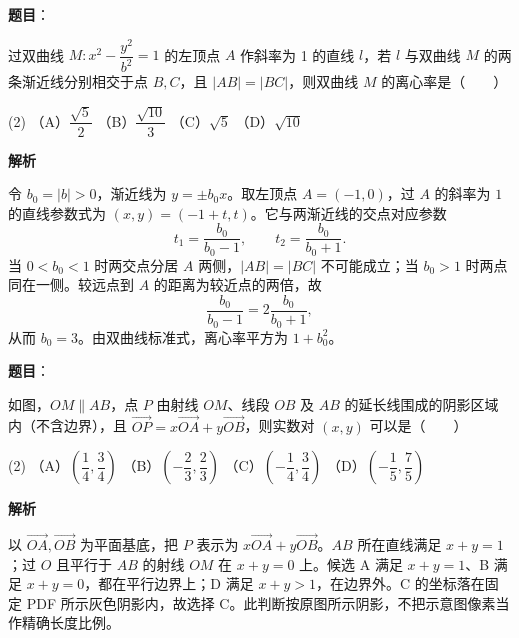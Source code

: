 \begin{answer}

\textbf{题目}：

过双曲线 $M:x^2-\dfrac{y^2}{b^2}=1$ 的左顶点 $A$ 作斜率为 1 的直线 $l$，若 $l$ 与双曲线 $M$ 的两条渐近线分别相交于点 $B,C$，且 $|AB|=|BC|$，则双曲线 $M$ 的离心率是\mbox{（　　）}

\begin{gkopts}(2)
\task （A）$\dfrac{\sqrt5}{2}$
\task （B）$\dfrac{\sqrt{10}}{3}$
\task （C）$\sqrt5$
\task （D）$\sqrt{10}$
\end{gkopts}

\textbf{解析}

令 $b_0=|b|>0$，渐近线为 $y=\pm b_0x$。取左顶点 $A=(-1,0)$，过 $A$ 的斜率为 $1$ 的直线参数式为 $(x,y)=(-1+t,t)$。它与两渐近线的交点对应参数
\nopagebreak[4]
\[
t_1=\frac{b_0}{b_0-1},\qquad t_2=\frac{b_0}{b_0+1}.
\]
当 $0<b_0<1$ 时两交点分居 $A$ 两侧，$|AB|=|BC|$ 不可能成立；当 $b_0>1$ 时两点同在一侧。较远点到 $A$ 的距离为较近点的两倍，故
\nopagebreak[4]
\[
\frac{b_0}{b_0-1}=2\frac{b_0}{b_0+1},
\]
从而 $b_0=3$。由双曲线标准式，离心率平方为 $1+b_0^2$。


\end{answer}
\begin{answer}

\textbf{题目}：

如图，$OM\parallel AB$，点 $P$ 由射线 $OM$、线段 $OB$ 及 $AB$ 的延长线围成的阴影区域内（不含边界），且 $\overrightarrow{OP}=x\overrightarrow{OA}+y\overrightarrow{OB}$，则实数对 $(x,y)$ 可以是\mbox{（　　）}

\begin{gkopts}(2)
\task （A）$\left(\dfrac14,\dfrac34\right)$
\task （B）$\left(-\dfrac23,\dfrac23\right)$
\task （C）$\left(-\dfrac14,\dfrac34\right)$
\task （D）$\left(-\dfrac15,\dfrac75\right)$
\end{gkopts}
\nopagebreak[4]
\begin{center}\end{center}
\nopagebreak[4]
\textbf{解析}

以 $\overrightarrow{OA},\overrightarrow{OB}$ 为平面基底，把 $P$ 表示为 $x\overrightarrow{OA}+y\overrightarrow{OB}$。$AB$ 所在直线满足 $x+y=1$；过 $O$ 且平行于 $AB$ 的射线 $OM$ 在 $x+y=0$ 上。候选 A 满足 $x+y=1$、B 满足 $x+y=0$，都在平行边界上；D 满足 $x+y>1$，在边界外。C 的坐标落在固定 PDF 所示灰色阴影内，故选择 C。此判断按原图所示阴影，不把示意图像素当作精确长度比例。
\nopagebreak[4]
\begin{center}\end{center}
\nopagebreak[4]

\end{answer}

